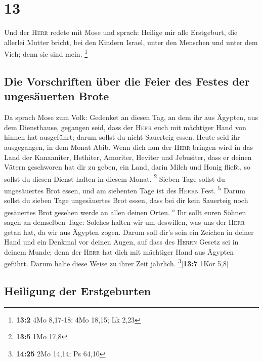 \hypertarget{section-12}{%
\section{13}\label{section-12}}

 Und der \textsc{Herr} redete mit Mose und sprach:
 Heilige mir alle Erstgeburt, die allerlei Mutter bricht,
bei den Kindern Israel, unter den Menschen und unter dem Vieh; denn sie
sind mein. \footnote{\textbf{13:2} 4Mo 8,17-18; 4Mo 18,15; Lk 2,23}

\hypertarget{die-vorschriften-uxfcber-die-feier-des-festes-der-ungesuxe4uerten-brote}{%
\subsection{Die Vorschriften über die Feier des Festes der ungesäuerten
Brote}\label{die-vorschriften-uxfcber-die-feier-des-festes-der-ungesuxe4uerten-brote}}

 Da sprach Mose zum Volk: Gedenket an diesen Tag, an dem
ihr aus Ägypten, aus dem Diensthause, gegangen seid, dass der
\textsc{Herr} euch mit mächtiger Hand von hinnen hat ausgeführt; darum
sollst du nicht Sauerteig essen.  Heute seid ihr
ausgegangen, in dem Monat Abib.  Wenn dich nun der
\textsc{Herr} bringen wird in das Land der Kanaaniter, Hethiter,
Amoriter, Heviter und Jebusiter, dass er deinen Vätern geschworen hat
dir zu geben, ein Land, darin Milch und Honig fließt, so sollst du
diesen Dienst halten in diesem Monat. \footnote{\textbf{13:5} 1Mo 17,8}
 Sieben Tage sollst du ungesäuertes Brot essen, und am
siebenten Tage ist des \textsc{Herrn} Fest. \textsuperscript{b}
 Darum sollst du sieben Tage ungesäuertes Brot essen, dass
bei dir kein Sauerteig noch gesäuertes Brot gesehen werde an allen
deinen Orten. \textsuperscript{c}  Ihr sollt euren Söhnen
sagen an demselben Tage: Solches halten wir um deswillen, was uns der
\textsc{Herr} getan hat, da wir aus Ägypten zogen.  Darum
soll dir's sein ein Zeichen in deiner Hand und ein Denkmal vor deinen
Augen, auf dass des \textsc{Herrn} Gesetz sei in deinem Munde; denn der
\textsc{Herr} hat dich mit mächtiger Hand aus Ägypten geführt.
 Darum halte diese Weise zu ihrer Zeit jährlich.
\footnote{\textbf{14:25} 2Mo 14,14; Ps 64,10}{[}\textbf{13:7} 1Kor
5,8{]}

\hypertarget{heiligung-der-erstgeburten}{%
\subsection{Heiligung der
Erstgeburten}\label{heiligung-der-erstgeburten}}


